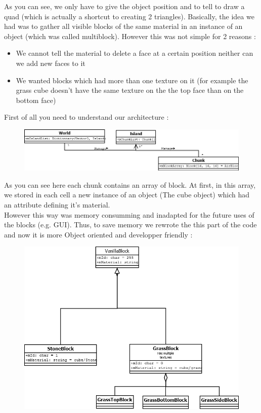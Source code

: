 \documentclass[article]{report} %
\begin{document}
As you can see, we only have to give the object position and to tell to draw a quad (which is actually a shortcut to creating 2 triangles).
Basically, the idea we had was to gather all visible blocks of the same material in an instance of an object (which was called multiblock). However this was not simple for 2 reasons :
\begin{itemize}
\item We cannot tell the material to delete a face at a certain position neither can we add new faces to it
\item We wanted blocks which had more than one texture on it (for example the grass cube doesn't have the same texture on the the top face than on the bottom
 face)
 \end {itemize}

First of all you need to understand our architecture : 
				\begin{figure}[h]
				\includegraphics[scale=0.5]{images/Hierarchy.png}
				\end{figure}

As you can see here each chunk contains an array of block. At first, in this array, we stored in each cell a new instance of an object (The cube object) which had an attribute defining it's material.\\

However this way was memory consumming and inadapted for the future uses of the blocks (e.g. GUI). Thus, to save memory we rewrote the this part of the code and now it is more Object oriented and developper friendly : 

				\begin{figure}[h]
				\includegraphics[scale=0.5]{images/cubes.png}
				\end{figure}
\end{document}
